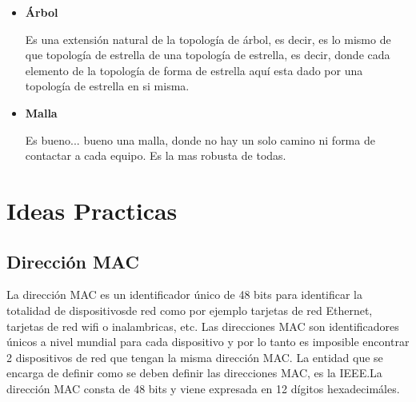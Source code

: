 \documentclass[12pt, fleqn]{report}                             %
\theoremstyle{break}                                            %
\begin{document}
\begin{itemize}
                \clearpage

                \item \textbf{Árbol}
                
                    Es una extensión natural de la topología de árbol, es decir, es lo mismo de que topología
                    de estrella de una topología de estrella, es decir, donde cada elemento de la topología
                    de forma de estrella aquí esta dado por una topología de estrella en si misma.

                \item \textbf{Malla}
                
                    Es bueno... bueno una malla, donde no hay un solo camino ni forma de contactar a cada equipo.
                    Es la mas robusta de todas.

            \end{itemize}

            


    \chapter{Ideas Practicas}            


        \clearpage
        \section{Dirección MAC}

            La dirección MAC es un identificador único de 48 bits para identificar la totalidad
            de dispositivosde red como por ejemplo tarjetas de red Ethernet, tarjetas de red wifi
            o inalambricas, etc. Las direcciones MAC son identificadores únicos a nivel mundial
            para cada dispositivo y por lo tanto es imposible encontrar 2 dispositivos de red que tengan
            la misma dirección MAC. La entidad que se encarga de definir como se deben definir las
            direcciones MAC, es la IEEE.La dirección MAC consta de 48 bits y viene expresada en 12
            dígitos hexadecimáles.
\end{document}
